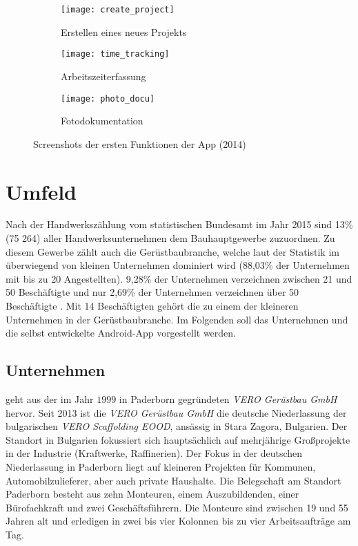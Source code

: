 \begin{figure}[h]
  \centering
  \begin{subfigure}[t]{0.3\textwidth}
    \texttt{[image: create\_project]}
    \caption{Erstellen eines neues Projekts}
  \end{subfigure}
  \begin{subfigure}[t]{0.3\textwidth}
    \texttt{[image: time\_tracking]}
    \caption{Arbeitszeiterfassung}
  \end{subfigure}
  \begin{subfigure}[t]{0.3\textwidth}
    \texttt{[image: photo\_docu]}
    \caption{Fotodokumentation}
  \end{subfigure}
  \caption{Screenshots der ersten Funktionen der App (2014)}
  \label{fig:app14}
\end{figure}

\section{Umfeld}
Nach der Handwerkszählung vom statistischen Bundesamt im Jahr 2015 sind 13\% (75 264) aller Handwerksunternehmen dem Bauhauptgewerbe zuzuordnen.
Zu diesem Gewerbe zählt auch die Gerüstbaubranche, welche laut der Statistik im überwiegend von kleinen Unternehmen dominiert wird (88,03\% der Unternehmen mit bis zu 20 Angestellten). 
9,28\% der Unternehmen verzeichnen zwischen 21 und 50 Beschäftigte und nur 2,69\% der Unternehmen verzeichnen über 50 Beschäftigte \cite{HZ17}.
Mit 14 Beschäftigten gehört die \vr{} zu einem der kleineren Unternehmen in der Gerüstbaubranche.
Im Folgenden soll das Unternehmen und die selbst entwickelte Android-App vorgestellt werden.

\subsection{Unternehmen}
\vr{} geht aus der im Jahr $1999$ in Paderborn gegründeten \emph{VERO Gerüstbau GmbH} hervor. 
Seit 2013 ist die \emph{VERO Gerüstbau GmbH} die deutsche Niederlassung der bulgarischen \emph{VERO Scaffolding EOOD}, ansässig in Stara Zagora, Bulgarien.
Der Standort in Bulgarien fokussiert sich hauptsächlich auf mehrjährige Großprojekte in der Industrie (Kraftwerke, Raffinerien).
Der Fokus in der deutschen Niederlassung in Paderborn liegt auf kleineren Projekten für Kommunen, Automobilzulieferer, aber auch private Haushalte.
Die Belegschaft am Standort Paderborn besteht aus zehn Monteuren, einem Auszubildenden, einer Bürofachkraft und zwei Geschäftsführern.
Die Monteure sind zwischen 19 und 55 Jahren alt und erledigen in zwei bis vier Kolonnen bis zu vier Arbeitsaufträge am Tag.

